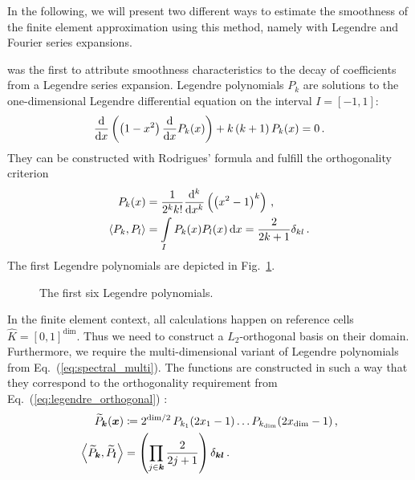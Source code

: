 In the following, we will present two different ways to estimate the smoothness of the finite element approximation using this method, namely with Legendre and Fourier series expansions.

\textcite{mavriplis1994} was the first to attribute smoothness characteristics to the decay of coefficients from a Legendre series expansion. Legendre polynomials $P_k$ are solutions to the one-dimensional Legendre differential equation on the interval $I = [-1,1]$:
\begin{align}
\frac{\mathop{}\!\mathrm{d}}{\mathop{}\!\mathrm{d}x} \left(\left(1-x^{2}\right) \frac{\mathop{}\!\mathrm{d}}{\mathop{}\!\mathrm{d}x} P_k(x)\right)+ k \left(k+1\right) P_k(x)=0 \,\text{.}
\end{align}
They can be constructed with Rodrigues' formula and fulfill the orthogonality criterion
\begin{align}
P_k(x) &= \frac{1}{2^k k!} \frac{\mathop{}\!\mathrm{d}^k}{\mathop{}\!\mathrm{d}x^k} \left( \left(x^2 - 1\right)^k \right) \,\text{,} \\
\label{eq:legendre_orthogonal} \langle P_k, P_l\rangle &= \int\limits_I P_k(x) P_l(x) \mathop{}\!\mathrm{d}x = \frac{2}{2 k+1} \delta_{k l} \,\text{.}
\end{align}
The first Legendre polynomials are depicted in Fig.~\ref{fig:legendre}. \textcite{dealiilegendre}

\begin{figure}
\centering

\caption[The first Legendre polynomials.]{The first six Legendre polynomials.}
\label{fig:legendre}
\end{figure}

In the finite element context, all calculations happen on reference cells $\widehat{K} = [0,1]^\text{dim}$. Thus we need to construct a $L_2$-orthogonal basis on their domain. Furthermore, we require the multi-dimensional variant of Legendre polynomials from Eq.~(\ref{eq:spectral_multi}). The functions are constructed in such a way that they correspond to the orthogonality requirement from Eq.~(\ref{eq:legendre_orthogonal}) \textcite{dealiilegendre}:
\begin{align}
\widetilde{P}_\tuple{k}(\vec{x}) &\coloneqq 2^{\text{dim}/2} \, P_{k_1}(2x_1 - 1) \dots P_{k_\text{dim}}(2x_\text{dim} - 1) \,\text{,} \\
\left\langle \widetilde{P}_\tuple{k}, \widetilde{P}_\tuple{l} \right\rangle &= \left(\prod\limits_{j \in \tuple{k}} \frac{2}{2j+1}\right) \delta_{\tuple{k} \tuple{l}} \,\text{.}
\end{align}

